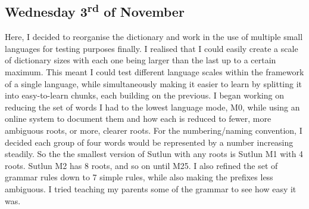 \documentclass[a4paper,10pt]{article}
\begin{document}
\subsection{Wednesday 3\textsuperscript{rd} of November}
Here, I decided to reorganise the dictionary and work in the use of multiple small languages
for testing purposes finally. I realised that I could easily create a scale of dictionary
sizes with each one being larger than the last up to a certain maximum. This meant I could
test different language scales within the framework of a single language, while simultaneously
making it easier to learn by splitting it into easy-to-learn chunks, each building on the
previous. I began working on reducing the set of words I had to the lowest language mode, M0,
while using an online system to document them and how each is reduced to fewer, more ambiguous
roots, or more, clearer roots. For the numbering/naming convention, I decided each group of
four words would be represented by a number increasing steadily. So the the smallest version of
Sutlun with any roots is Sutlun M1 with 4 roots. Sutlun M2 has 8 roots, and so on until M25.
I also refined the set of grammar rules down to 7 simple rules, while also making the prefixes
less ambiguous. I tried teaching my parents some of the grammar to see how easy it was.
\end{document}
